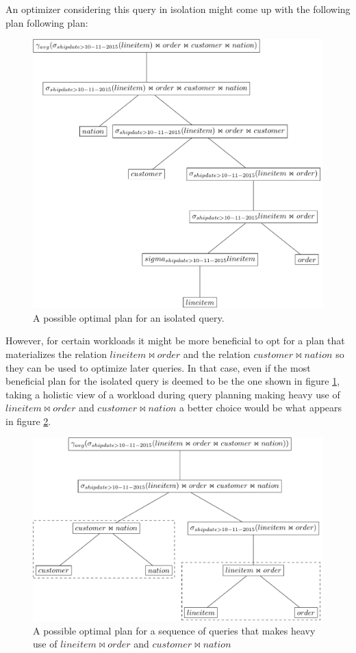 An optimizer considering this query in isolation might come up with
the following plan following plan:

\begin{figure}[p]
  \centering
  \includegraphics[width=.9\linewidth]{./imgs/optplan.pdf}
  \caption{\label{fig:optplan}A possible optimal plan for an isolated query.}
\end{figure}

However, for certain workloads it might be more beneficial to opt for
a plan that materializes the relation \(lineitem \Join order\) and the
relation \(customer \Join nation\) so they can be used to optimize
later queries. In that case, even if the most beneficial plan for the
isolated query is deemed to be the one shown in figure \ref{fig:optplan},
taking a holistic view of a workload during query planning making
heavy use of \(lineitem \Join order\) and \(customer \Join nation\) a
better choice would be what appears in figure \ref{fig:workplan}.

\begin{figure}[p]
  \centering
  \includegraphics[width=.9\linewidth]{./imgs/workplan.pdf}
  \caption{\label{fig:workplan}A possible optimal plan for a sequence of queries that makes heavy use of \(lineitem \Join order\) and \(customer \Join nation\)}
\end{figure}

